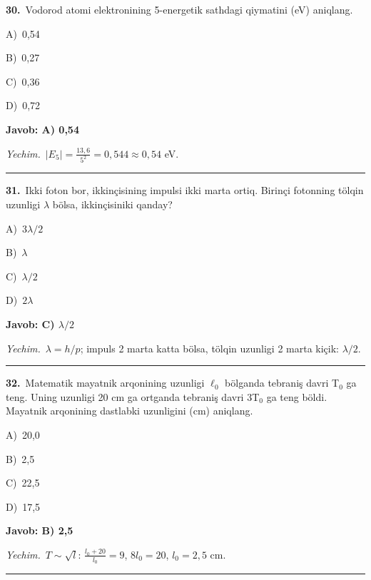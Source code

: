 \documentclass[11pt,a4paper]{article}
\newcommand{\opt}[2]{\hspace*{4mm}#1)\ #2\par}
\begin{document}
\noindent\begin{minipage}{\linewidth}
\textbf{30.}\ Vodorod atomi elektronining 5-energetik sathdagi qiymatini (eV) aniqlang.\par\smallskip
\opt{A}{0,54}
\opt{B}{0,27}
\opt{C}{0,36}
\opt{D}{0,72}
\end{minipage}\vspace{2pt}\par
\noindent\colorbox{gray!12}{\parbox{\dimexpr\linewidth-2\fboxsep}{\textbf{Javob: A) 0,54}}}\par\smallskip
\noindent\textit{Yechim.}\ $|E_5|=\frac{13{,}6}{5^2}=0{,}544\approx0{,}54$ eV.\par\par\medskip\hrule\medskip
{}\noindent\begin{minipage}{\linewidth}
\textbf{31.}\ Ikki foton bor, ikkinçisining impulsi ikki marta ortiq. Birinçi fotonning tölqin uzunligi $\lambda$ bölsa, ikkinçisiniki qanday?\par\smallskip
\opt{A}{$3\lambda/2$}
\opt{B}{$\lambda$}
\opt{C}{$\lambda/2$}
\opt{D}{$2\lambda$}
\end{minipage}\vspace{2pt}\par
\noindent\colorbox{gray!12}{\parbox{\dimexpr\linewidth-2\fboxsep}{\textbf{Javob: C) $\lambda/2$}}}\par\smallskip
\noindent\textit{Yechim.}\ $\lambda=h/p$; impuls 2 marta katta bölsa, tölqin uzunligi 2 marta kiçik: $\lambda/2$.\par\par\medskip\hrule\medskip
{}\noindent\begin{minipage}{\linewidth}
\textbf{32.}\ Matematik mayatnik arqonining uzunligi $\ell_{0}$ bölganda tebraniş davri T$_{0}$ ga teng. Uning uzunligi 20 cm ga ortganda tebraniş davri 3T$_{0}$ ga teng böldi. Mayatnik arqonining dastlabki uzunligini (cm) aniqlang.\par\smallskip
\opt{A}{20,0}
\opt{B}{2,5}
\opt{C}{22,5}
\opt{D}{17,5}
\end{minipage}\vspace{2pt}\par
\noindent\colorbox{gray!12}{\parbox{\dimexpr\linewidth-2\fboxsep}{\textbf{Javob: B) 2,5}}}\par\smallskip
\noindent\textit{Yechim.}\ $T\sim\sqrt l$: $\frac{l_0+20}{l_0}=9$, $8l_0=20$, $l_0=2{,}5$ cm.\par\par\medskip\hrule\medskip
\end{document}
